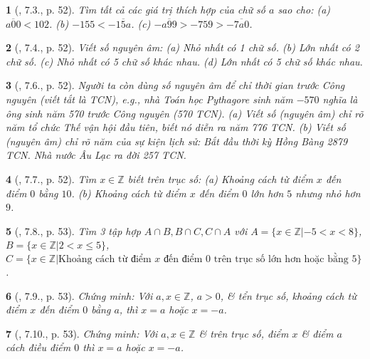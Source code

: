 \documentclass{article}
\newtheorem{baitoan}{}
\begin{document}
\begin{baitoan}[\cite{Binh_boi_duong_Toan_6_tap_1}, 7.3., p. 52]
	Tìm tất cả các giá trị thích hợp của chữ số $a$ sao cho: (a) $\overline{a00} < 102$. (b) $-155 < -\overline{15a}$. (c) $-\overline{a99} > -759 > -\overline{7a0}$.
\end{baitoan}

\begin{baitoan}[\cite{Binh_boi_duong_Toan_6_tap_1}, 7.4., p. 52]
	Viết số nguyên âm: (a) Nhỏ nhất có 1 chữ số. (b) Lớn nhất có 2 chữ số. (c) Nhỏ nhất có 5 chữ số khác nhau. (d) Lớn nhất có 5 chữ số khác nhau.
\end{baitoan}

\begin{baitoan}[\cite{Binh_boi_duong_Toan_6_tap_1}, 7.6., p. 52]
	Người ta còn dùng số nguyên âm để chỉ thời gian trước Công nguyên (viết tắt là {\rm TCN}), e.g., nhà Toán học Pythagore sinh năm $-570$ nghĩa là ông sinh năm 570 trước Công nguyên ({\rm570 TCN}). (a) Viết số (nguyên âm) chỉ rõ năm tổ chức Thế vận hội đầu tiên, biết nó diễn ra năm {\rm776 TCN}. (b) Viết số (nguyên âm) chỉ rõ năm của sự kiện lịch sử: Bắt đầu thời kỳ Hồng Bàng {\rm2879 TCN}. Nhà nước Âu Lạc ra đời {\rm257 TCN}.
\end{baitoan}

\begin{baitoan}[\cite{Binh_boi_duong_Toan_6_tap_1}, 7.7., p. 52]
	Tìm $x\in\mathbb{Z}$ biết trên trục số: (a) Khoảng cách từ điểm $x$ đến điểm $0$ bằng $10$. (b) Khoảng cách từ điểm $x$ đến điểm $0$ lớn hơn $5$ nhưng nhỏ hơn $9$.
\end{baitoan}

\begin{baitoan}[\cite{Binh_boi_duong_Toan_6_tap_1}, 7.8., p. 53]
	Tìm 3 tập hợp $A\cap B,B\cap C,C\cap A$ với $A = \{x\in\mathbb{Z}|-5 < x < 8\}$, $B = \{x\in\mathbb{Z}|2 < x\le5\}$, $C = \{x\in\mathbb{Z}|\mbox{Khoảng cách từ điểm $x$ đến điểm 0 trên trục số lớn hơn hoặc bằng 5}\}$. 
\end{baitoan}

\begin{baitoan}[\cite{Binh_boi_duong_Toan_6_tap_1}, 7.9., p. 53]
	Chứng minh: Với $a,x\in\mathbb{Z}$, $a > 0$, \& tển trục số, khoảng cách từ điểm $x$ đến điểm $0$ bằng $a$, thì $x = a$ hoặc $x = -a$.
\end{baitoan}

\begin{baitoan}[\cite{Binh_boi_duong_Toan_6_tap_1}, 7.10., p. 53]
	Chứng minh: Với $a,x\in\mathbb{Z}$ \& trên trục số, điểm $x$ \& điểm $a$ cách điều điểm $0$ thì $x = a$ hoặc $x = -a$.
\end{baitoan}
\end{document}
